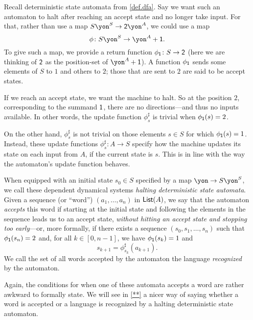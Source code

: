 \documentclass[Book-Poly]{subfiles}
\begin{document}
\begin{example}\label{ex.regular_lang_stop}
Recall deterministic state automata from \cref{def.dfa}.
Say we want such an automaton to halt after reaching an accept state and no longer take input.
For that, rather than use a map $S\yon^S\to \2\yon^A$, we could use a map
\[
\phi\colon S\yon^S\to \yon^A+\1.
\]
To give such a map, we provide a return function $\phi_{\textsf{1}}\colon S\to\textsf{2}$ (here we are thinking of $\textsf{2}$ as the position-set of $\yon^A+\1$).
A function $\phi_{\textsf{1}}$ sends some elements of $S$ to $1$ and others to $2$; those that are sent to $2$ are said to be accept states.

If we reach an accept state, we want the machine to halt.
So at the position $2$, corresponding to the summand $\textsf{1}$, there are no directions---and thus no inputs available.
In other words, the update function $\phi^\sharp_s$ is trivial when $\phi_{\textsf{1}}(s)=2$.

On the other hand, $\phi^\sharp_s$ is not trivial on those elements $s\in S$ for which $\phi_{\textsf{1}}(s)=1$.
Instead, these update functions $\phi^\sharp_s\colon A\to S$ specify how the machine updates its state on each input from $A$, if the current state is $s$.
This is in line with the way the automaton's update function behaves.

When equipped with an initial state $s_0\in S$ specified by a map $\yon\to S\yon^S$, we call these dependent dynamical systems \emph{halting deterministic state automata}.
Given a sequence (or ``word'') $(a_1,\ldots,a_n)$ in $\mathsf{List}(A)$, we say that the automaton \emph{accepts} this word if starting at the initial state and following the elements in the sequence leads us to an accept state, \emph{without hitting an accept state and stopping too early}---or, more formally, if there exists a sequence $(s_0,s_1,\ldots,s_n)$ such that $\phi_{\textsf{1}}(s_n)=2$ and, for all $k\in[0,n-1]$, we have $\phi_{\textsf{1}}(s_k)=1$ and
\[
    s_{k+1}=\phi^\sharp_{s_k}(a_{k+1}).
\]
We call the set of all words accepted by the automaton the language \emph{recognized} by the automaton.
\end{example}

\begin{remark}
Again, the conditions for when one of these automata accepts a word are rather awkward to formally state.
We will see in \cref{**} a nicer way of saying whether a word is accepted or a language is recognized by a halting deterministic state automaton.
\end{remark}
\end{document}
